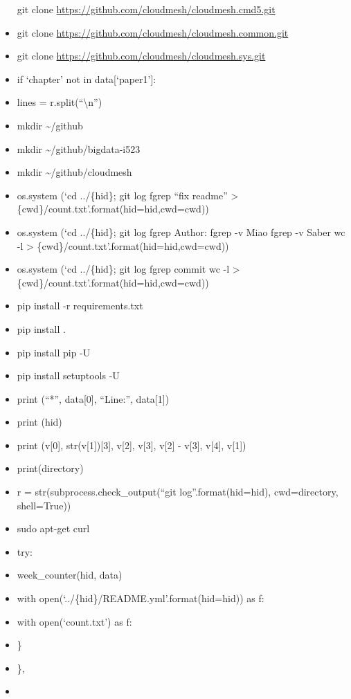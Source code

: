 \begin{itemize}
  git clone \url{https://github.com/cloudmesh/cloudmesh.cmd5.git}
\item
  git clone \url{https://github.com/cloudmesh/cloudmesh.common.git}
\item
  git clone \url{https://github.com/cloudmesh/cloudmesh.sys.git}
\item
  if `chapter' not in data{[}`paper1'{]}:
\item
  lines = r.split(``\textbackslash{}n'')
\item
  mkdir \textasciitilde{}/github
\item
  mkdir \textasciitilde{}/github/bigdata-i523
\item
  mkdir \textasciitilde{}/github/cloudmesh
\item
  os.system (`cd ../\{hid\}; git log \textbar{} fgrep ``fix readme''
  \textgreater{} \{cwd\}/count.txt'.format(hid=hid,cwd=cwd))
\item
  os.system (`cd ../\{hid\}; git log \textbar{} fgrep Author: fgrep -v
  Miao fgrep -v Saber \textbar{} wc -l \textgreater{}
  \{cwd\}/count.txt'.format(hid=hid,cwd=cwd))
\item
  os.system (`cd ../\{hid\}; git log \textbar{} fgrep commit \textbar{}
  wc -l \textgreater{} \{cwd\}/count.txt'.format(hid=hid,cwd=cwd))
\item
  pip install -r requirements.txt
\item
  pip install .
\item
  pip install pip -U
\item
  pip install setuptools -U
\item
  print (``*'', data{[}0{]}, ``Line:'', data{[}1{]})
\item
  print (hid)
\item
  print (v{[}0{]}, str(v{[}1{]}){[}3{]}, v{[}2{]}, v{[}3{]}, v{[}2{]} -
  v{[}3{]}, v{[}4{]}, v{[}1{]})
\item
  print(directory)
\item
  r = str(subprocess.check\_output(``git log''.format(hid=hid),
  cwd=directory, shell=True))
\item
  sudo apt-get curl
\item
  try:
\item
  week\_counter(hid, data)
\item
  with open(`../\{hid\}/README.yml'.format(hid=hid)) as f:
\item
  with open(`count.txt') as f:
\item
  \}
\item
  \},
\item

\end{itemize}
